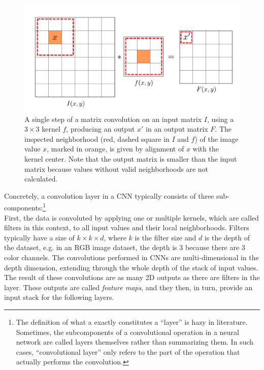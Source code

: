 \begin {figure}[!htb]
	\begin{center}
		\includegraphics[scale=0.45]{img/fig_convolution}
	\end{center}
	\caption[Matrix convolution.]{A single step of a matrix convolution on an input matrix $I$, using a $3 \times 3$ kernel $f$, producing an output $x'$ in an output matrix $F$. The inspected neighborhood (red, dashed square in $I$ and $f$) of the image value $x$, marked in orange, is given by alignment of $x$ with the kernel center. Note that the output matrix is smaller than the input matrix because values without valid neighborhoods are not calculated.}
	\label{fig:convolution}
\end {figure}

\noindent Concretely, a convolution layer in a CNN typically consists of three sub-components:\footnote{The definition of what a exactly constitutes a ``layer'' is hazy in literature. Sometimes, the subcomponents of a convolutional operation in a neural network are called layers themselves rather than summarizing them. In such cases, ``convolutional layer'' only refers to the part of the operation that actually performs the convolution.}\\

\noindent First, the data is convoluted by applying one or multiple kernels, which are called filters in this context, to all input values and their local neighborhoods. Filters typically have a size of $k \times k \times d$, where $k$ is the filter size and $d$ is the depth of the dataset, e.g. in an RGB image dataset, the depth is 3 because there are 3 color channels. The convolutions performed in CNNs are multi-dimensional in the depth dimension, extending through the whole depth of the stack of input values. The result of these convolutions are as many 2D outputs as there are filters in the layer. These outputs are called \textit{feature maps}, and they then, in turn, provide an input stack for the following layers.

